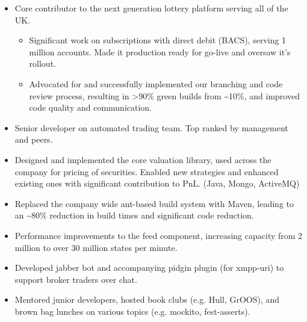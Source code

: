 \documentclass[11pt,a4paper,roman]{moderncv}
\begin{document}
\begin{itemize}
\item Core contributor to the next generation lottery platform serving all of the UK.
  \begin{itemize}
  \item Significant work on subscriptions with direct debit (BACS), serving 1 million accounts. Made it production ready for go-live and oversaw it's rollout.
  \item Advocated for and successfully implemented our branching and code review process, resulting in >90\% green builds from \textasciitilde10\%, and improved code quality and communication.
  \end{itemize}
\end{itemize}

\vspace{5mm}

\begin{itemize}
\item Senior developer on automated trading team. Top ranked by management and peers.
\item Designed and implemented the core valuation library, used across the company for pricing of securities. Enabled new strategies and enhanced existing ones with significant contribution to PnL. (Java, Mongo, ActiveMQ)
\item Replaced the company wide ant-based build system with Maven, leading to an \textasciitilde80\% reduction in build times and significant code reduction.
\clearpage
\item Performance improvements to the feed component, increasing capacity from 2 million to over 30 million states per minute.
\item Developed jabber bot and accompanying pidgin plugin (for xmpp-uri) to support broker traders over chat.
\item Mentored junior developers, hosted book clubs (e.g. Hull, GrOOS), and brown bag lunches on various topics (e.g. mockito, fest-asserts).
\end{itemize}

\vspace{5mm}
\end{document}
